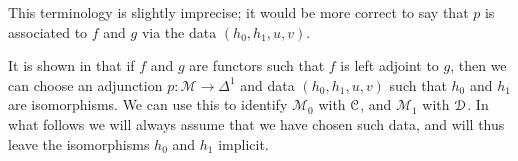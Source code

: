 \documentclass[main.tex]{subfiles}
\begin{document}
\begin{note}
  This terminology is slightly imprecise; it would be more correct to say that $p$ is associated to $f$ and $g$ via the data $(h_{0}, h_{1}, u, v)$.
\end{note}

\begin{note}
  It is shown in \cite{highertopostheory} that if $f$ and $g$ are functors such that $f$ is left adjoint to $g$, then we can choose an adjunction $p\colon \mathcal{M} \to \Delta^{1}$ and data $(h_{0}, h_{1}, u, v)$ such that $h_{0}$ and $h_{1}$ are isomorphisms. We can use this to identify $\mathcal{M}_{0}$ with $\mathcal{C}$, and $\mathcal{M}_{1}$ with $\mathcal{D}$. In what follows we will always assume that we have chosen such data, and will thus leave the isomorphisms $h_{0}$ and $h_{1}$ implicit.
\end{note}
\end{document}
